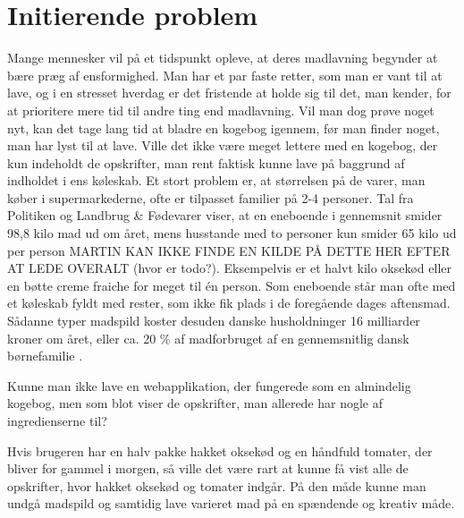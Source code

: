 \section{Initierende problem}
Mange mennesker vil på et tidspunkt opleve, at deres madlavning begynder at bære præg af ensformighed. Man har et par faste retter, som man er vant til at lave, og i en stresset hverdag er det fristende at holde sig til det, man kender, for at prioritere mere tid til andre ting end madlavning. Vil man dog prøve noget nyt, kan det tage lang tid at bladre en kogebog igennem, før man finder noget, man har lyst til at lave. Ville det ikke være meget lettere med en kogebog, der kun indeholdt de opskrifter, man rent faktisk kunne lave på baggrund af indholdet i ens køleskab. Et stort problem er, at størrelsen på de varer, man køber i supermarkederne, ofte er tilpasset familier på 2-4 personer. Tal fra Politiken og Landbrug \& Fødevarer viser, at en eneboende i gennemsnit smider 98,8 kilo mad ud om året, mens husstande med to personer kun smider 65 kilo ud per person MARTIN KAN IKKE FINDE EN KILDE PÅ DETTE HER EFTER AT LEDE OVERALT (hvor er todo?). Eksempelvis er et halvt kilo oksekød eller en bøtte creme fraiche for meget til én person. Som eneboende står man ofte med et køleskab fyldt med rester, som ikke fik plads i de foregående dages aftensmad. Sådanne typer madspild koster desuden danske husholdninger 16 milliarder kroner om året, eller ca. 20 \% af madforbruget af en gennemsnitlig dansk børnefamilie \cite{madspild16}. 

Kunne man ikke lave en webapplikation, der fungerede som en almindelig kogebog, men som blot viser de opskrifter, man allerede har nogle af ingredienserne til? 

Hvis brugeren har en halv pakke hakket oksekød og en håndfuld tomater, der bliver for gammel i morgen, så ville det være rart at kunne få vist alle de opskrifter, hvor hakket oksekød og tomater indgår. På den måde kunne man undgå madspild og samtidig lave varieret mad på en spændende og kreativ måde.
